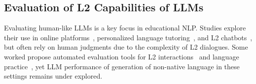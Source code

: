 \subsection{Evaluation of L2 Capabilities of LLMs} 
Evaluating human-like LLMs is a key focus in educational NLP. Studies explore their use in online platforms~\cite{manoharanmaximizing}, personalized language tutoring~\cite{mejeh2024taking}, and L2 chatbots~\cite{yigci2024large}, but often rely on human judgments due to the complexity of L2 dialogues. Some worked propose automated evaluation tools for L2 interactions~\cite{gao-etal-2025-interaction} and language practice~\cite{huzaifah2024evaluating}, yet LLM performance of generation of non-native language in these settings remains under explored.


